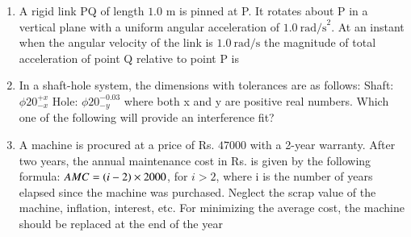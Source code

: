 \documentclass[journal,12pt,onecolumn]{IEEEtran}
\theoremstyle{remark}
\begin{document}
\begin{enumerate}
\item A rigid link PQ of length $1.0$ m is pinned at P. It rotates about P in a vertical plane with a uniform angular acceleration of $1.0~\text{rad/s}^2$. At an instant when the angular velocity of the link is $1.0~\text{rad/s}$ the magnitude of total acceleration  of point Q relative to point P is

\hfill{}

\begin{enumerate}
\end{enumerate}

\item In a shaft-hole system, the dimensions with tolerances  are as follows:
Shaft: $\phi 20_{-x}^{+x}$ \quad Hole: $\phi 20_{-y}^{-0.03}$
where both x and y are positive real numbers. Which one of the following will provide an interference fit?

\hfill{}

\begin{enumerate}
\end{enumerate}

\item A machine is procured at a price of Rs. $47000$ with a 2-year warranty. After two years, the annual maintenance cost  in Rs. is given by the following formula:
$AMC=\left(i-2\right) \times 2000$, for $i>2$,
where i is the number of years elapsed since the machine was purchased. Neglect the scrap value of the machine, inflation, interest, etc. For minimizing the average cost, the machine should be replaced at the end of the year

\hfill{}

\begin{enumerate}
\end{enumerate}


\end{enumerate}
\end{document}
